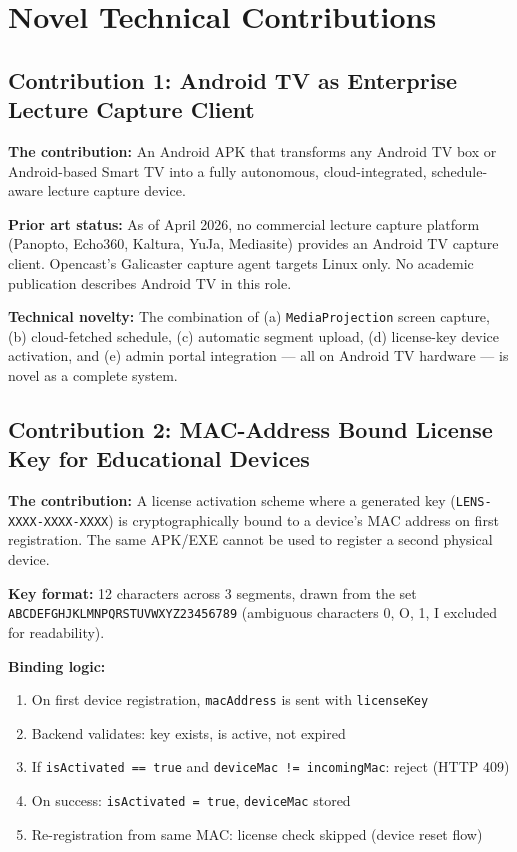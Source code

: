 \documentclass[12pt,a4paper]{article}
\begin{document}
\section{Novel Technical Contributions}

\subsection{Contribution 1: Android TV as Enterprise Lecture Capture Client}

\textbf{The contribution:} An Android APK that transforms any Android TV box or Android-based Smart TV into a fully autonomous, cloud-integrated, schedule-aware lecture capture device.

\textbf{Prior art status:} As of April 2026, no commercial lecture capture platform (Panopto, Echo360, Kaltura, YuJa, Mediasite) provides an Android TV capture client. Opencast's Galicaster capture agent targets Linux only. No academic publication describes Android TV in this role.

\textbf{Technical novelty:} The combination of (a) \texttt{MediaProjection} screen capture, (b) cloud-fetched schedule, (c) automatic segment upload, (d) license-key device activation, and (e) admin portal integration — all on Android TV hardware — is novel as a complete system.

\subsection{Contribution 2: MAC-Address Bound License Key for Educational Devices}

\textbf{The contribution:} A license activation scheme where a generated key (\texttt{LENS-XXXX-XXXX-XXXX}) is cryptographically bound to a device's MAC address on first registration. The same APK/EXE cannot be used to register a second physical device.

\textbf{Key format:} 12 characters across 3 segments, drawn from the set \texttt{ABCDEFGHJKLMNPQRSTUVWXYZ23456789} (ambiguous characters 0, O, 1, I excluded for readability).

\textbf{Binding logic:}
\begin{enumerate}
    \item On first device registration, \texttt{macAddress} is sent with \texttt{licenseKey}
    \item Backend validates: key exists, is active, not expired
    \item If \texttt{isActivated == true} and \texttt{deviceMac != incomingMac}: reject (HTTP 409)
    \item On success: \texttt{isActivated = true}, \texttt{deviceMac} stored
    \item Re-registration from same MAC: license check skipped (device reset flow)
\end{enumerate}
\end{document}
